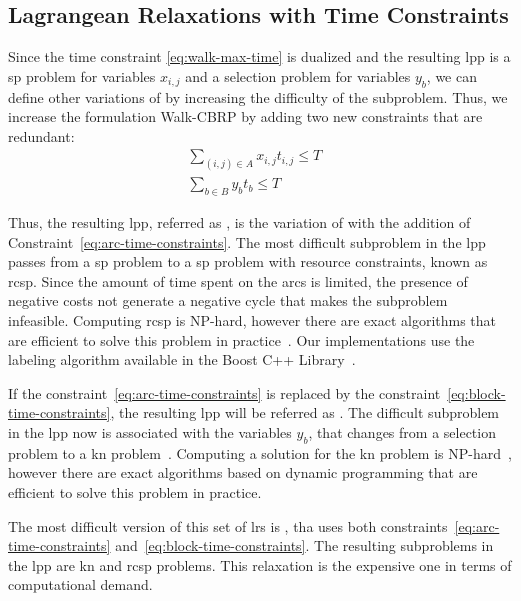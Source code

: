 \subsection{Lagrangean Relaxations with Time Constraints}\label{sec:lr-time-constraints}

Since the time constraint \eqref{eq:walk-max-time} is dualized and the resulting
\gls{lpp} is a \gls{sp} problem for variables $x_{i,j}$ and a selection problem for variables $y_b$,
we can define other variations of {\lrsp} by increasing the difficulty of the subproblem.
Thus, we increase the formulation Walk-CBRP by adding two new constraints that are redundant:
\begin{align}
	\sum_{(i,j) \in A} x_{i,j}t_{i,j} \leq T & \label{eq:arc-time-constraints}   \\
	\sum_{b \in B} y_b t_b \leq T            & \label{eq:block-time-constraints}
\end{align}

Thus, the resulting \gls{lpp}, referred as {\lrcsp}, is the variation of {\lrsp} with the addition of
Constraint~\eqref{eq:arc-time-constraints}.
The most difficult subproblem in the \gls{lpp} passes from a \gls{sp} problem to a
\gls{sp} problem with resource constraints, known as \gls{rcsp}. Since the amount
of time spent on the arcs is limited, the presence of negative costs not generate
a negative cycle that makes the subproblem infeasible. Computing  \gls{rcsp} is NP-hard,
however there are  exact algorithms that are efficient to  solve this problem in
practice~\cite{irnich:2006}. Our  implementations use  the labeling  algorithm
available  in   the  Boost  C++  Library~\cite{boost:2020}.

If the constraint~\eqref{eq:arc-time-constraints} is replaced by
the constraint~\eqref{eq:block-time-constraints}, the resulting \gls{lpp} will be referred as {\lrkn}.
The difficult subproblem in the \gls{lpp} now is associated with the variables $y_b$, that changes
from a selection problem to a \gls{kn} problem~\cite{karp:1972}. Computing a solution for the \gls{kn} problem
is NP-hard~\cite{korte:2008}, however there are exact algorithms based on dynamic programming that are
efficient to solve this problem in practice.

The most difficult version of this set of \gls{lrs} is {\lrcspkn}, tha uses both
constraints~\eqref{eq:arc-time-constraints} and~\eqref{eq:block-time-constraints}.
The resulting subproblems in the \gls{lpp} are \gls{kn} and \gls{rcsp} problems.
This relaxation is the expensive one in terms of computational demand.

